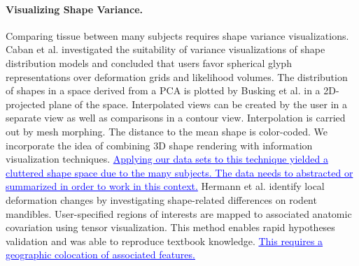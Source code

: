 \documentclass[journal]{style/vgtc} 			          %
\newcommand{\add}[1]{\textcolor{blue}{\uline{#1}}}
\begin{document}
\paragraph{Visualizing Shape Variance.}
Comparing tissue between many subjects requires shape variance visualizations.
%
Caban et al. \cite{Caban2011} investigated the suitability of variance visualizations of shape distribution models and concluded that users favor spherical glyph representations over deformation grids and likelihood volumes.
%
The distribution of shapes in a space derived from a PCA is plotted by Busking et al. \cite{Busking2010a} in a 2D-projected plane of the space.
%
Interpolated views can be created by the user in a separate view as well as comparisons in a contour view.
%
Interpolation is carried out by mesh morphing.
%
The distance to the mean shape is color-coded.
%
We incorporate the idea of combining 3D shape rendering with information visualization techniques.
%
\add{Applying our data sets to this technique yielded a cluttered shape space due to the many subjects.
%
The data needs to abstracted or summarized in order to work in this context.}
%
Hermann et al. \cite{Hermann2014} identify local deformation changes by investigating shape-related differences on rodent mandibles.
%
User-specified regions of interests are mapped to associated anatomic covariation using tensor visualization.
%
This method enables rapid hypotheses validation and was able to reproduce textbook knowledge.
%
%
\add{This requires a geographic colocation of associated features.}
%

\end{document}
